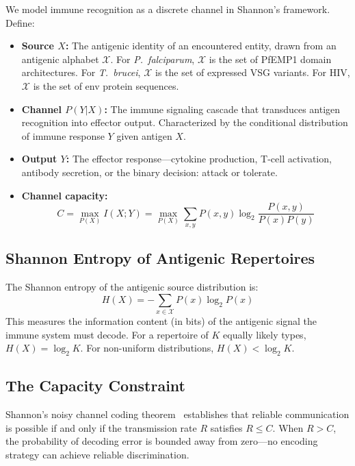 \documentclass[twocolumn,10pt]{article}
\begin{document}
We model immune recognition as a discrete channel in Shannon's framework.  Define:
\begin{itemize}
\item \textbf{Source $X$:} The antigenic identity of an encountered entity, drawn from an antigenic alphabet $\mathcal{X}$.  For \textit{P.~falciparum}, $\mathcal{X}$ is the set of PfEMP1 domain architectures.  For \textit{T.~brucei}, $\mathcal{X}$ is the set of expressed VSG variants.  For HIV, $\mathcal{X}$ is the set of env protein sequences.
\item \textbf{Channel $P(Y|X)$:} The immune signaling cascade that transduces antigen recognition into effector output.  Characterized by the conditional distribution of immune response $Y$ given antigen $X$.
\item \textbf{Output $Y$:} The effector response---cytokine production, T-cell activation, antibody secretion, or the binary decision: attack or tolerate.
\item \textbf{Channel capacity:}
\begin{equation}
C = \max_{P(X)} I(X;Y) = \max_{P(X)} \sum_{x,y} P(x,y) \log_2 \frac{P(x,y)}{P(x)P(y)}
\label{eq:capacity}
\end{equation}
\end{itemize}

\subsection{Shannon Entropy of Antigenic Repertoires}

The Shannon entropy of the antigenic source distribution is:
\begin{equation}
H(X) = -\sum_{x \in \mathcal{X}} P(x) \log_2 P(x)
\label{eq:entropy}
\end{equation}
This measures the information content (in bits) of the antigenic signal the immune system must decode.  For a repertoire of $K$ equally likely types, $H(X) = \log_2 K$.  For non-uniform distributions, $H(X) < \log_2 K$.

\subsection{The Capacity Constraint}

Shannon's noisy channel coding theorem~\citep{shannon1948} establishes that reliable communication is possible if and only if the transmission rate $R$ satisfies $R \leq C$.  When $R > C$, the probability of decoding error is bounded away from zero---no encoding strategy can achieve reliable discrimination.
\end{document}
